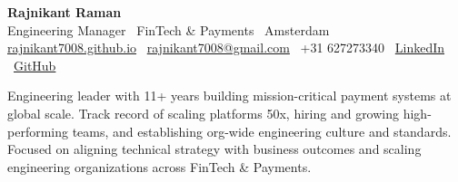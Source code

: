 \documentclass[9pt,a4paper]{article}
\begin{document}
\begin{center}
  {\fontsize{20}{22}\selectfont\bfseries Rajnikant Raman}\\[2pt]
  {\small\color{accent} Engineering Manager \textbar\ FinTech \& Payments \textbar\ Amsterdam}\\[3pt]
  {\footnotesize\color{mid}
    \href{https://rajnikant7008.github.io}{rajnikant7008.github.io}
    \textbar\ \href{mailto:rajnikant7008@gmail.com}{rajnikant7008@gmail.com}
    \textbar\ +31 627273340
    \textbar\ \href{https://linkedin.com/in/rajnikant7008}{LinkedIn}
    \textbar\ \href{https://github.com/rajnikant7008}{GitHub}
  }
\end{center}

\vspace{1pt}

\begin{mdframed}[style=summarybox]
{\small\color{soft} Engineering leader with 11+ years building mission-critical payment systems at global scale. Track record of scaling platforms {\color{accent}50x}, hiring and growing high-performing teams, and establishing org-wide engineering culture and standards. Focused on aligning technical strategy with business outcomes and scaling engineering organizations across FinTech \& Payments.}
\end{mdframed}

\vspace{1pt}
\end{document}
